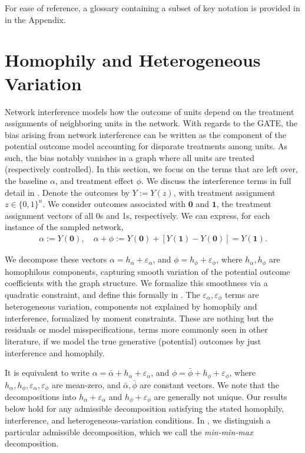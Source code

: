\documentclass[12pt]{article}
\theoremstyle{definition}
\numberwithin{equation}{section}
\numberwithin{figure}{section}
\numberwithin{equation}{section}
\numberwithin{figure}{section}
\begin{document}
For ease of reference, a glossary containing a subset of key notation is provided in  in the Appendix.

\section{Homophily and Heterogeneous Variation} \label{homophily_heterogeneous}

Network interference models how the outcome of units depend on the treatment assignments of neighboring units in the network. With regards to the GATE, the bias arising from network interference can be written as the component of the potential outcome model accounting for disparate treatments among units. As such, the bias notably vanishes in a graph where all units are treated (respectively controlled). In this section, we focus on the terms that are left over, the baseline $\alpha$, and treatment effect $\phi$. We discuss the interference terms in full detail in . 
Denote the outcomes by $Y:=Y(z)$, with treatment assignment $z \in \{0, 1\}^n$. We consider outcomes associated with $\mathbf{0}$ and $\mathbf{1}$, the treatment assignment vectors of all 0s and 1s, respectively. We can express, for each instance of the sampled network,
\begin{align} \label{extremes_ate}
    \alpha:=Y(\mathbf{0}),\quad 
    \alpha + \phi:= Y(\mathbf{0}) + [Y(\mathbf{1}) - Y(\mathbf{0})] = Y(\mathbf{1}). 
\end{align}

We decompose these vectors $\alpha = h_{\alpha} + \varepsilon_{\alpha}$, and $\phi = h_{\phi} + \varepsilon_{\phi}$, where $h_{\alpha}, h_{\phi}$ are homophilous components, capturing smooth variation of the potential outcome coefficients with the graph structure. We formalize this smoothness via a quadratic constraint, and define this formally in . The $\varepsilon_{\alpha}, \varepsilon_{\phi}$ terms are heterogeneous variation, components not explained by homophily and interference, formalized by moment constraints. These are nothing but the residuals or model misspecifications, terms more commonly seen in other literature, if we model the true generative (potential) outcomes by just interference and homophily. 

\begin{remark} \label{remark:mean_decomposition_nonunique}
    It is equivalent to write $\alpha = \bar{\alpha} + h_\alpha + \varepsilon_\alpha$, and $\phi = \bar{\phi} + h_\phi + \varepsilon_\phi$, where $h_\alpha, h_\phi, \varepsilon_\alpha, \varepsilon_\phi$ are mean-zero, and $\bar{\alpha}, \bar{\phi}$ are constant vectors.
    We note that the decompositions into $h_\alpha + \varepsilon_\alpha$ and $h_\phi + \varepsilon_\phi$ are generally not unique. Our results below hold for any admissible decomposition satisfying the stated homophily, interference, and heterogeneous-variation conditions. In , we distinguish a particular admissible decomposition, which we call the \textit{min-min-max} decomposition.
\end{remark}
\end{document}
